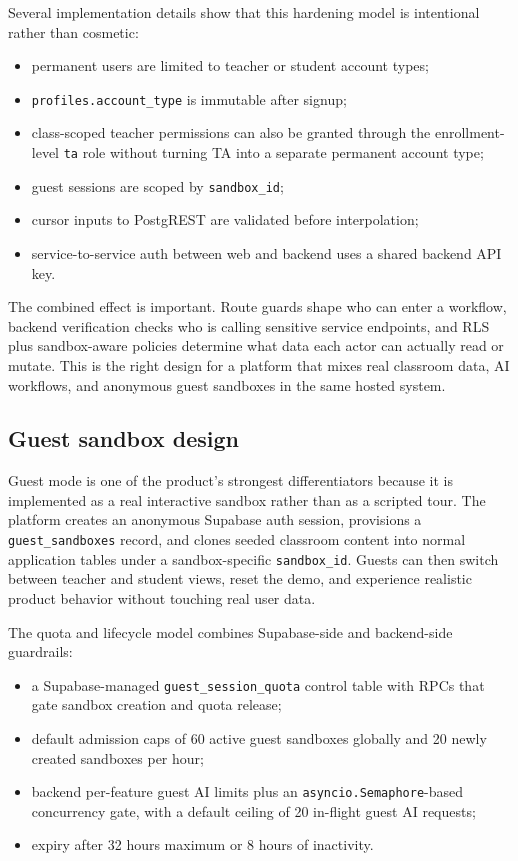 \documentclass[11pt,a4paper]{article}
\begin{document}
Several implementation details show that this hardening model is intentional rather than cosmetic:
\begin{itemize}
  \item permanent users are limited to teacher or student account types;
  \item \texttt{profiles.account\_type} is immutable after signup;
  \item class-scoped teacher permissions can also be granted through the enrollment-level
  \texttt{ta} role without turning TA into a separate permanent account type;
  \item guest sessions are scoped by \texttt{sandbox\_id};
  \item cursor inputs to PostgREST are validated before interpolation;
  \item service-to-service auth between web and backend uses a shared backend API key.
\end{itemize}

The combined effect is important. Route guards shape who can enter a workflow, backend verification
checks who is calling sensitive service endpoints, and RLS plus sandbox-aware policies determine what
data each actor can actually read or mutate. This is the right design for a platform that mixes real
classroom data, AI workflows, and anonymous guest sandboxes in the same hosted system.

\subsection{Guest sandbox design}

Guest mode is one of the product's strongest differentiators because it is implemented as a real
interactive sandbox rather than as a scripted tour. The platform creates an anonymous Supabase auth
session, provisions a \texttt{guest\_sandboxes} record, and clones seeded classroom content into normal
application tables under a sandbox-specific \texttt{sandbox\_id}. Guests can then switch between teacher
and student views, reset the demo, and experience realistic product behavior without touching real
user data.

The quota and lifecycle model combines Supabase-side and backend-side guardrails:
\begin{itemize}
  \item a Supabase-managed \texttt{guest\_session\_quota} control table with RPCs that gate
  sandbox creation and quota release;
  \item default admission caps of 60 active guest sandboxes globally and 20 newly created
  sandboxes per hour;
  \item backend per-feature guest AI limits plus an \texttt{asyncio.Semaphore}-based
  concurrency gate, with a default ceiling of 20 in-flight guest AI requests;
  \item expiry after 32 hours maximum or 8 hours of inactivity.
\end{itemize}
\end{document}
